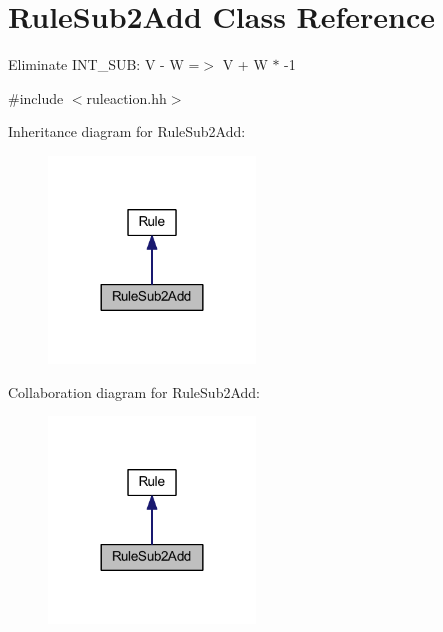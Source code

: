 \hypertarget{class_rule_sub2_add}{}\section{Rule\+Sub2\+Add Class Reference}
\label{class_rule_sub2_add}


Eliminate I\+N\+T\+\_\+\+S\+UB\+: {\ttfamily V -\/ W =$>$ V + W $\ast$ -\/1}  




{\ttfamily \#include $<$ruleaction.\+hh$>$}



Inheritance diagram for Rule\+Sub2\+Add\+:
\nopagebreak
\begin{figure}[H]
\begin{center}
\leavevmode
\includegraphics[width=156pt]{class_rule_sub2_add__inherit__graph}
\end{center}
\end{figure}


Collaboration diagram for Rule\+Sub2\+Add\+:
\nopagebreak
\begin{figure}[H]
\begin{center}
\leavevmode
\includegraphics[width=156pt]{class_rule_sub2_add__coll__graph}
\end{center}
\end{figure}
